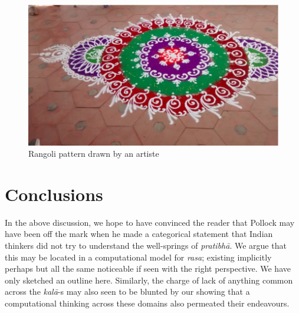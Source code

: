 \begin{figure}[H]
\centering
\includegraphics[scale=.8]{figures/8.eps}
\caption{Rangoli pattern drawn by an artiste}\label{chap3-fig6}
\end{figure}

\section{Conclusions}\label{chap3-sec6}

In the above discussion, we hope to have convinced the reader that Pollock may have been off the mark when he made a categorical statement that Indian thinkers did not try to understand the well-springs of \textsl{pratibhā}. We argue that this may be located in a computational model for \textsl{rasa}; existing implicitly perhaps but all the same noticeable if seen with the right perspective. We have only sketched an outline here. Similarly, the charge of lack of anything common across the \textsl{kalā}-s may also seen to be blunted by our showing that a computational thinking across these domains also permeated their endeavours.

